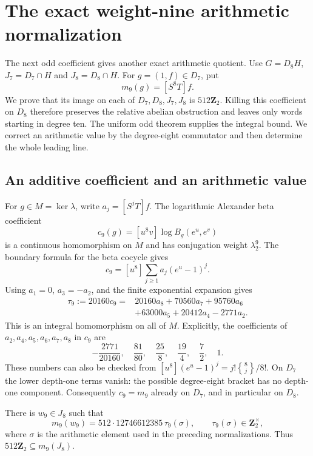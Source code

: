 \section{The exact weight-nine arithmetic normalization}
\label{sec:weight-nine-bounds}

The next odd coefficient gives another exact arithmetic quotient.
Use $G=D_8H$, $J_7=D_7\cap H$ and $J_8=D_8\cap H$.
For $g=(1,f)\in D_7$, put
\[
 m_9(g)=[S^8T]f.
\]
We prove that its image on each of $D_7,D_8,J_7,J_8$ is
$512\mathbf Z_2$. Killing this coefficient on $D_8$ therefore
preserves the relative abelian obstruction and leaves only words
starting in degree ten. The uniform odd theorem supplies the integral bound. We correct an
arithmetic value by the degree-eight commutator and then determine the
whole leading line.

\subsection{An additive coefficient and an arithmetic value}

For $g\in M=\ker\lambda$, write $a_j=[S^jT]f$. The logarithmic
Alexander beta coefficient
\[
 c_9(g)=[u^8v]\log B_g(e^u,e^v)
\]
is a continuous homomorphism on $M$ and has conjugation weight
$\lambda_2^9$. The boundary formula for the beta cocycle gives
\[
 c_9=[u^8]\sum_{j\ge1}a_j(e^u-1)^j.
\]
Using $a_1=0$, $a_3=-a_2$, and the finite exponential expansion gives
\begin{equation}\label{eq:weight-nine-beta-formula}
 \begin{split}
 \tau_9:=20160c_9={}&20160a_8+70560a_7+95760a_6\\
                  &+63000a_5+20412a_4-2771a_2.
 \end{split}
\end{equation}
This is an integral homomorphism on all of $M$. Explicitly, the
coefficients of $a_2,a_4,a_5,a_6,a_7,a_8$ in $c_9$ are
\[
 -\frac{2771}{20160},\quad\frac{81}{80},\quad
 \frac{25}{8},\quad\frac{19}{4},\quad\frac72,\quad1.
\]
These numbers can also be checked from
$[u^8](e^u-1)^j=j!\genfrac{\{}{\}}{0pt}{}{8}{j}/8!$.
On $D_7$ the lower depth-one terms vanish: the possible degree-eight
bracket has no depth-one component. Consequently $c_9=m_9$ already
on $D_7$, and in particular on $D_8$.

\begin{proposition}\label{prop:weight-nine-arithmetic-value}
There is $w_9\in J_8$ such that
\[
 m_9(w_9)=512\cdot12746612385\,\tau_9(\sigma),
 \qquad \tau_9(\sigma)\in\mathbf Z_2^\times,
\]
where $\sigma$ is the arithmetic element used in the preceding
normalizations. Thus $512\mathbf Z_2\subseteq m_9(J_8)$.
\end{proposition}

